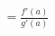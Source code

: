 \documentclass[preview]{standalone}
\begin{document}
\begin{align*}
= \frac{f'(a)}{g'(a)}
\end{align*}
\end{document}
